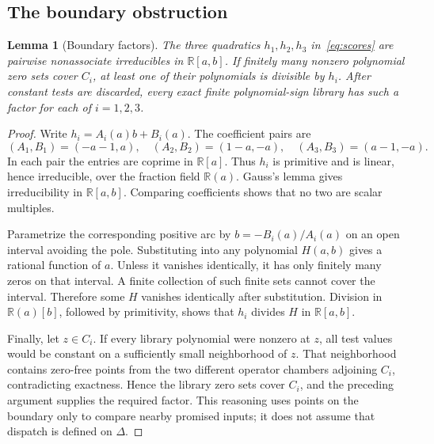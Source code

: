 \documentclass[11pt]{article}
\newtheorem{lemma}[theorem]{Lemma}
\theoremstyle{definition}
\theoremstyle{remark}
\newcommand{\R}{\mathbb R}
\begin{document}
\subsection{The boundary obstruction}
\begin{lemma}[Boundary factors]\label{lem:factors}
The three quadratics $h_1,h_2,h_3$ in~\eqref{eq:scores} are pairwise nonassociate irreducibles in $\R[a,b]$. If finitely many nonzero polynomial zero sets cover $C_i$, at least one of their polynomials is divisible by $h_i$. After constant tests are discarded, every exact finite polynomial-sign library has such a factor for each of $i=1,2,3$.
\end{lemma}
\begin{proof}
Write $h_i=A_i(a)b+B_i(a)$. The coefficient pairs are
\[
 (A_1,B_1)=(-a-1,a),\quad
 (A_2,B_2)=(1-a,-a),\quad
 (A_3,B_3)=(a-1,-a).
\]
In each pair the entries are coprime in $\R[a]$. Thus $h_i$ is primitive and is linear, hence irreducible, over the fraction field $\R(a)$. Gauss's lemma gives irreducibility in $\R[a,b]$. Comparing coefficients shows that no two are scalar multiples.

Parametrize the corresponding positive arc by $b=-B_i(a)/A_i(a)$ on an open interval avoiding the pole. Substituting into any polynomial $H(a,b)$ gives a rational function of $a$. Unless it vanishes identically, it has only finitely many zeros on that interval. A finite collection of such finite sets cannot cover the interval. Therefore some $H$ vanishes identically after substitution. Division in $\R(a)[b]$, followed by primitivity, shows that $h_i$ divides $H$ in $\R[a,b]$.

Finally, let $z\in C_i$. If every library polynomial were nonzero at $z$, all test values would be constant on a sufficiently small neighborhood of $z$. That neighborhood contains zero-free points from the two different operator chambers adjoining $C_i$, contradicting exactness. Hence the library zero sets cover $C_i$, and the preceding argument supplies the required factor. This reasoning uses points on the boundary only to compare nearby promised inputs; it does not assume that dispatch is defined on $\Delta$.
\end{proof}
\end{document}
